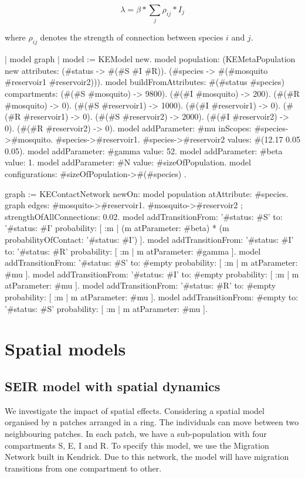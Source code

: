 \documentclass[a4paper,10pt,twoside]{book}
\begin{document}
  \begin{equation}
    \lambda = \beta * \sum_j \rho_{ij} * I_j
  \end{equation}
  
where  $\rho_{ij}$ denotes the strength of connection between species  $i$ and  $j$.


\begin{code}{}
| model graph |
	model := KEModel new.
	model
		population:
			(KEMetaPopulation new
				attributes:
					{(#status -> #(#S #I #R)).
					(#species -> #(#mosquito #reservoir1 #reservoir2))}).
	model
		buildFromAttributes: #(#status #species)
		compartments:
			{(#(#S #mosquito) -> 9800).
			(#(#I #mosquito) -> 200).
			(#(#R #mosquito) -> 0).
			(#(#S #reservoir1) -> 1000).
			(#(#I #reservoir1) -> 0).
			(#(#R #reservoir1) -> 0).
			(#(#S #reservoir2) -> 2000).
			(#(#I #reservoir2) -> 0).
			(#(#R #reservoir2) -> 0)}.
	model addParameter: #mu
		   inScopes: {
				#species->#mosquito.
				#species->#reservoir1.
				#species->#reservoir2}
		   values: #(12.17 0.05 0.05).
	model addParameter: #gamma value: 52.
	model addParameter: #beta value: 1.
	model addParameter: #N value: #sizeOfPopulation.
	model configurations: { #sizeOfPopulation->#(#species) }.

	graph := KEContactNetwork
			newOn: model population
			atAttribute: #species.
	graph edges: { #mosquito->#reservoir1. #mosquito->#reservoir2 };
			strengthOfAllConnections: 0.02.
	model
		addTransitionFrom: '{#status: #S}'
		to: '{#status: #I}'
		probability: [ :m | (m atParameter: #beta) * (m probabilityOfContact: '{#status: #I}') ].
	model
		addTransitionFrom: '{#status: #I}'
		to: '{#status: #R}'
		probability: [ :m | m atParameter: #gamma ].
	model
		addTransitionFrom: '{#status: #S}'
		to: #empty
		probability: [ :m | m atParameter: #mu ].
	model
		addTransitionFrom: '{#status: #I}'
		to: #empty
		probability: [ :m | m atParameter: #mu ].
	model
		addTransitionFrom: '{#status: #R}'
		to: #empty
		probability: [ :m | m atParameter: #mu ].
	model
		addTransitionFrom: #empty
		to: '{#status: #S}'
		probability: [ :m | m atParameter: #mu ].
\end{code}

\chapter{ Spatial models}\section{ SEIR model with spatial dynamics}
We investigate the impact of spatial effects.
Considering a spatial model organised by n patches arranged in a ring.
The individuals can move between two neighbouring patches.
In each patch, we have a sub-population with four compartments S, E, I and R.
To specify this model, we use the Migration Network built in Kendrick. Due to this network, the model will have migration transitions from one compartment to other.
\end{document}
